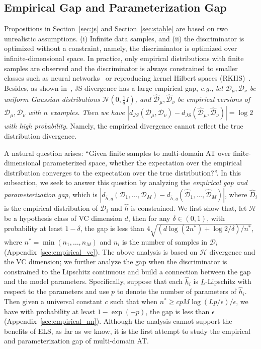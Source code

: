 \documentclass{article} \usepackage{iclr2023_conference,times}
\newcommand{\ls}[0]{ELS\xspace}
\newcommand{\eg}[0]{\textit{e.g., }}
\newcommand{\D}{\mathcal{D}}
\begin{document}
\subsection{Empirical Gap and Parameterization Gap}\label{sec:empirical:gap}
\vspace{-0.15cm}
Propositions in Section~\ref{sec:js} and Section~\ref{sec:stable} are based on two  unrealistic assumptions. (i) Infinite data samples, and (ii) the discriminator is optimized without a constraint, namely, the discriminator is optimized over infinite-dimensional space. In practice, only empirical distributions with finite samples are observed and the discriminator is always constrained to smaller classes such as neural networks~\citep{goodfellow2014generative} or reproducing kernel Hilbert spaces (RKHS)~\citep{li2017mmd}. Besides, as shown in~\citep{arora2017generalization,schfer2019implicit}, JS divergence has a large empirical gap, \eg \textit{let $\D_\mu,\D_\nu$ be uniform Gaussian distributions $\mathcal{N}(0,\frac{1}{d}I)$, and $\hat{\D}_\mu,\hat{\D}_\nu$ be empirical versions of $\D_\mu,\D_\nu$ with $n$ examples. Then we have $|d_{JS}(\D_\mu,\D_\nu)-d_{JS}(\hat{\D}_\mu,\hat{\D}_\nu)|=\log2$ with high probability}. Namely, the empirical divergence cannot reflect the true distribution divergence.

A natural question arises: ``Given finite samples to multi-domain AT over finite-dimensional parameterized space, whether the expectation over the empirical distribution converges to the expectation over the true distribution?''. In this subsection, we seek to answer this question by analyzing the \textit{empirical gap and parameterization gap}, which is $|d_{\hat{h}, g}(\D_1,\dots,\D_M)-d_{\hat{h}, g}(\hat{\D}_1,\dots,\hat{\D}_M)|$, where $\hat{D}_i$ is the empirical distribution of $\D_i$ and $\hat{h}$ is constrained. We first show that, let $\mathcal{H}$ be a hypothesis class of VC dimension $d$, then for any $\delta\in(0,1)$, with probability at least $1-\delta$, the gap is less than $ 4\sqrt{({d\log(2n^*)+\log{2}/{\delta}})/{n^*}}$, where $n^*=\min(n_1,\dots,n_M)$ and $n_i$ is the number of samples in $\D_i$ (Appendix~\ref{sec:empirical_vc}). The above analysis is based on $\mathcal{H}$ divergence and the VC dimension; we further analyze the gap when the discriminator is constrained to the Lipschitz continuous and build a connection between the gap and the model parameters. Specifically, suppose that each $\hat{h}_i$ is $L$-Lipschitz with respect to the parameters and use $p$ to denote the number of parameters of $\hat{h}_i$. Then given a universal constant $c$ such that when $n^*\geq {cpM \log(Lp/\epsilon)}/{\epsilon }$, we have with probability at least $1-\exp(-p)$, the gap is less than $\epsilon$ (Appendix~\ref{sec:empirical_nn}). Although the analysis cannot support the benefits of \ls, as far as we know, it is the first attempt to study the empirical and parameterization gap of multi-domain AT.
\end{document}
